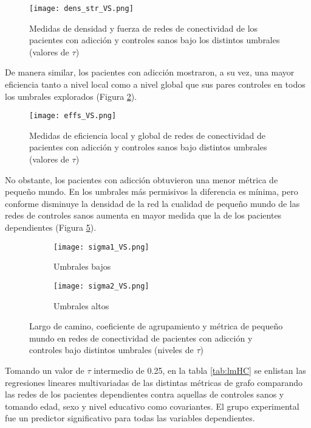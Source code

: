 \begin{figure}[!ht]
    \centering
    \texttt{[image: dens\_str\_VS.png]}
    \caption{Medidas de densidad y fuerza de redes de conectividad  de los pacientes con adicción y controles sanos bajo los distintos umbrales (valores de $\tau$)}
    \label{fig:dsHC}
\end{figure}

De manera similar, los pacientes con adicción mostraron, a su vez, una mayor eficiencia tanto a nivel local como a nivel global que sus pares controles en todos los umbrales explorados (Figura \ref{fig:effHC}).

\begin{figure}[!ht]
    \centering
    \texttt{[image: effs\_VS.png]}
    \caption{Medidas de eficiencia local y global de redes de conectividad de pacientes con adicción y controles sanos bajo distintos umbrales (valores de $\tau$)}
    \label{fig:effHC}
\end{figure}

No obstante, los pacientes con adicción obtuvieron una menor métrica de pequeño mundo.
En los umbrales más permisivos la diferencia es mínima, pero conforme disminuye la densidad de la red la cualidad de pequeño mundo de las redes de controles sanos aumenta en mayor medida que la de los pacientes dependientes (Figura \ref{fig:sigmaHC}).

\begin{figure}[!ht]
    \centering
    \begin{subfigure}[t]{0.8\textwidth}
        \centering
        \texttt{[image: sigma1\_VS.png]}
        \caption{Umbrales bajos}
        \label{fig:sigma1}
    \end{subfigure}
    \begin{subfigure}[t]{0.8\textwidth}
        \centering
        \texttt{[image: sigma2\_VS.png]}
        \caption{Umbrales altos}
        \label{fig:sigma2}
    \end{subfigure}
    \caption{Largo de camino, coeficiente de agrupamiento y métrica de pequeño mundo en redes de conectividad de pacientes con adicción y controles bajo distintos umbrales (niveles de $\tau$)}
    \label{fig:sigmaHC}
\end{figure}

Tomando un valor de $\tau$ intermedio de 0.25, en la tabla \ref{tab:lmHC} se enlistan las regresiones lineares multivariadas de las distintas métricas de grafo comparando las redes de los pacientes dependientes contra aquellas de controles sanos y tomando edad, sexo y nivel educativo como covariantes. El grupo experimental fue un predictor significativo para todas las variables dependientes.

